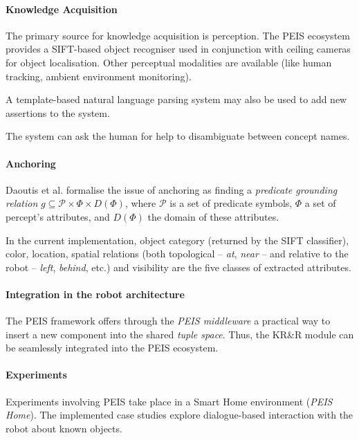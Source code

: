 \documentclass[a4paper, twocolumn]{article}
\begin{document}
\paragraph{Knowledge Acquisition} The primary source for knowledge acquisition
is perception.  The PEIS ecosystem provides a SIFT-based object recogniser used
in conjunction with ceiling cameras for object localisation.  Other perceptual
modalities are available (like human tracking, ambient environment monitoring).

A template-based natural language parsing system may also be used to add new
assertions to the system.

The system can ask the human for help to disambiguate between concept names.

\paragraph{Anchoring} Daoutis et al. formalise the issue of anchoring as
finding a \emph{predicate grounding relation} $g \subseteq \mathcal{P} \times
\Phi \times D(\Phi)$, where $\mathcal{P}$ is a set of predicate symbols, $\Phi$
a set of percept's attributes, and $D(\Phi)$ the domain of these attributes.

In the current implementation, object category (returned by the SIFT
classifier), color, location, spatial relations (both topological -- \emph{at},
\emph{near} -- and relative to the robot -- \emph{left}, \emph{behind}, etc.)
and visibility are the five classes of extracted attributes.

\paragraph{Integration in the robot architecture}
\label{sect|peis-integration}

The PEIS framework offers through the \emph{PEIS middleware} a practical way to
insert a new component into the shared \emph{tuple space}.  Thus, the KR\&R
module can be seamlessly integrated into the PEIS ecosystem.

\paragraph{Experiments} Experiments involving PEIS take place in a Smart Home
environment (\emph{PEIS Home}). The implemented case studies explore
dialogue-based interaction with the robot about known objects.

\end{document}
